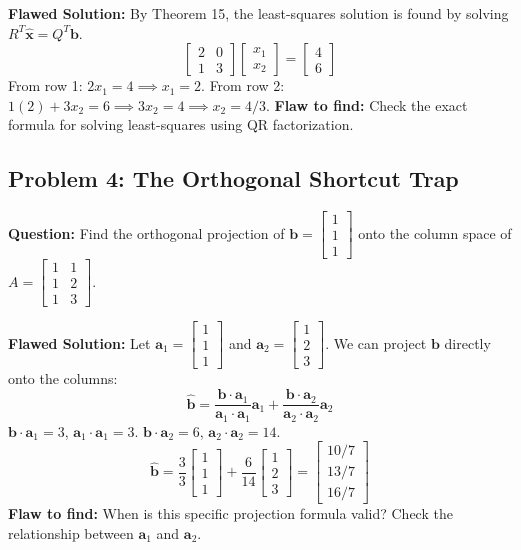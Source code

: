\documentclass[11pt, letterpaper]{article}
\theoremstyle{definition}
\theoremstyle{remark}
\begin{document}
\textbf{Flawed Solution:}
By Theorem 15, the least-squares solution is found by solving $R^T \hat{\mathbf{x}} = Q^T \mathbf{b}$.
\[ \begin{bmatrix} 2 & 0 \\ 1 & 3 \end{bmatrix} \begin{bmatrix} x_1 \\ x_2 \end{bmatrix} = \begin{bmatrix} 4 \\ 6 \end{bmatrix} \]
From row 1: $2x_1 = 4 \implies x_1 = 2$.
From row 2: $1(2) + 3x_2 = 6 \implies 3x_2 = 4 \implies x_2 = 4/3$.
\textbf{Flaw to find:} Check the exact formula for solving least-squares using QR factorization.

\subsection{Problem 4: The Orthogonal Shortcut Trap}
\textbf{Question:} Find the orthogonal projection of $\mathbf{b} = \begin{bmatrix} 1 \\ 1 \\ 1 \end{bmatrix}$ onto the column space of $A = \begin{bmatrix} 1 & 1 \\ 1 & 2 \\ 1 & 3 \end{bmatrix}$.

\textbf{Flawed Solution:}
Let $\mathbf{a}_1 = \begin{bmatrix} 1 \\ 1 \\ 1 \end{bmatrix}$ and $\mathbf{a}_2 = \begin{bmatrix} 1 \\ 2 \\ 3 \end{bmatrix}$.
We can project $\mathbf{b}$ directly onto the columns:
\[ \hat{\mathbf{b}} = \frac{\mathbf{b} \cdot \mathbf{a}_1}{\mathbf{a}_1 \cdot \mathbf{a}_1} \mathbf{a}_1 + \frac{\mathbf{b} \cdot \mathbf{a}_2}{\mathbf{a}_2 \cdot \mathbf{a}_2} \mathbf{a}_2 \]
$\mathbf{b} \cdot \mathbf{a}_1 = 3$, $\mathbf{a}_1 \cdot \mathbf{a}_1 = 3$.
$\mathbf{b} \cdot \mathbf{a}_2 = 6$, $\mathbf{a}_2 \cdot \mathbf{a}_2 = 14$.
\[ \hat{\mathbf{b}} = \frac{3}{3} \begin{bmatrix} 1 \\ 1 \\ 1 \end{bmatrix} + \frac{6}{14} \begin{bmatrix} 1 \\ 2 \\ 3 \end{bmatrix} = \begin{bmatrix} 10/7 \\ 13/7 \\ 16/7 \end{bmatrix} \]
\textbf{Flaw to find:} When is this specific projection formula valid? Check the relationship between $\mathbf{a}_1$ and $\mathbf{a}_2$.
\end{document}
